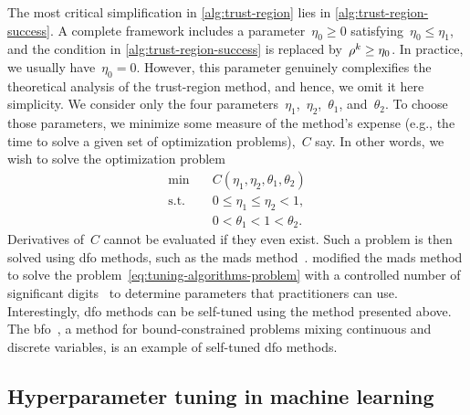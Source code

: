 The most critical simplification in \cref{alg:trust-region} lies in \cref{alg:trust-region-success}.
A complete framework includes a parameter~$\eta_0 \ge 0$ satisfying~$\eta_0 \le \eta_1$, and the condition in \cref{alg:trust-region-success} is replaced by~$\ratio[k] \ge \eta_0$.
In practice, we usually have~$\eta_0 = 0$.
However, this parameter genuinely complexifies the theoretical analysis of the trust-region method, and hence, we omit it here simplicity.
We consider only the four parameters~$\eta_1$,~$\eta_2$,~$\theta_1$, and~$\theta_2$.
To choose those parameters, we minimize some measure of the method's expense (e.g., the  time to solve a given set of optimization problems),~$C$ say.
In other words, we wish to solve the optimization problem
\begin{subequations}
    \label{eq:tuning-algorithms-problem}
    \begin{align}
        \min        & \quad C(\eta_1, \eta_2, \theta_1, \theta_2)\\
        \text{s.t.} & \quad 0 \le \eta_1 \le \eta_2 < 1,\\
                    & \quad 0 < \theta_1 < 1 < \theta_2.
    \end{align}
\end{subequations}
Derivatives of~$C$ cannot be evaluated if they even exist.
Such a problem is then solved using \gls{dfo} methods, such as the \gls{mads} method~\cite{Audet_Orban_2006}.
 modified the \gls{mads} method to solve the problem~\cref{eq:tuning-algorithms-problem} with a controlled number of significant digits~\cite{Audet_Digabel_Tribes_2019} to determine parameters that practitioners can use.
Interestingly, \gls{dfo} methods can be self-tuned using the method presented above.
The \gls{bfo}~\cite{Porcelli_Toint_2017}, a method for bound-constrained problems mixing continuous and discrete variables, is an example of self-tuned \gls{dfo} methods.

\subsection{Hyperparameter tuning in machine learning}
\label{subsec:machine-learning}

